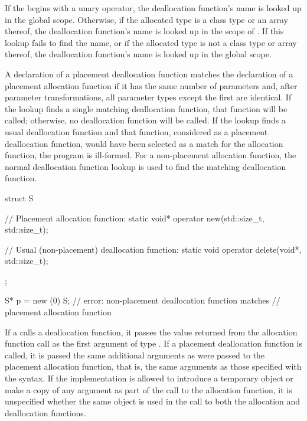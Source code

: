 \pnum
If the  begins with a unary \tcode{::}
operator, the deallocation function's name is looked up in the global
scope. Otherwise, if the allocated type is a class type  or an
array thereof, the deallocation function's name is looked up in the
scope of . If this lookup fails to find the name, or if the
allocated type is not a class type or array thereof, the deallocation
function's name is looked up in the global scope.

\pnum
A declaration of a placement deallocation function matches the
declaration of a placement allocation function if it has the same number
of parameters and, after parameter transformations, all
parameter types except the first are identical. If
the lookup finds a single matching deallocation function, that function
will be called; otherwise, no deallocation function will be called. If
the lookup finds a usual deallocation
function
and that function,
considered as a placement deallocation function, would have been
selected as a match for the allocation function, the program is
ill-formed. For a non-placement allocation function, the normal deallocation
function lookup is used to find the matching deallocation
function.
\begin{example}
\begin{codeblock}
struct S {
  // Placement allocation function:
  static void* operator new(std::size_t, std::size_t);

  // Usual (non-placement) deallocation function:
  static void operator delete(void*, std::size_t);
};

S* p = new (0) S;   // error: non-placement deallocation function matches
                    // placement allocation function
\end{codeblock}

\end{example}

\pnum
If a  calls a deallocation function, it passes
the value returned from the allocation function call as the first
argument of type . If a placement deallocation function is
called, it is passed the same additional arguments as were passed to the
placement allocation function, that is, the same arguments as those
specified with the  syntax.
If the implementation is allowed
to introduce a temporary object or make a copy of any argument
as part of the call to the allocation function,
it is unspecified whether the same object is used in the call
to both the allocation and deallocation functions.


